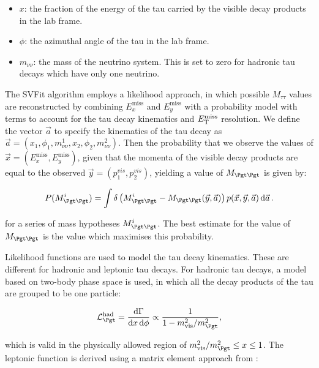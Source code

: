 \begin{itemize}
\item $x$: the fraction of the energy of the tau carried by the visible decay
products in the lab frame.
\item $\phi$: the azimuthal angle of the tau in the lab frame. 
\item $m_{\nu\nu}$: the mass of the neutrino system. This is set to zero for hadronic tau
decays which have only one neutrino.
\end{itemize}

The SVFit algorithm employs a likelihood approach, in which possible
$M_{\tau\tau}$ values are reconstructed by combining $E_{x}^{\text{miss}}$ and
$E_{y}^{\text{miss}}$ with a probability model with terms to account for the tau
decay kinematics and $E_{\mathrm{T}}^{\text{miss}}$ resolution. We define the vector $\vec{a}$ to
specify the kinematics of the tau decay as $\vec{a} =
\left(x_{1},\phi_{1},m_{\nu\nu}^{1},x_{2},\phi_{2},m_{\nu\nu}^{2}\right)$. Then the
probability that we observe the values of $\vec{x} = \left(E_{x}^{\text{miss}},
E_{y}^{\text{miss}}\right)$, given that the momenta of the visible decay products are
equal to the observed $\vec{y} = \left(p_{1}^{vis},p_{2}^{vis} \right)$,
yielding a value of $M_{\Pgt\Pgt}$ is given by: 

\begin{equation} \label{eqn:svfit-prob}
P(M_{\Pgt\Pgt}^{i}) = \int\delta\left(M_{\Pgt\Pgt}^{i} -
M_{\Pgt\Pgt}(\vec{y},\vec{a})\right)p(\vec{x},\vec{y},\vec{a})\,\text{d}\vec{a}\,
.
\end{equation}

for a series of mass hypotheses $M_{\Pgt\Pgt}^{i}$. The best estimate for the
value of $M_{\Pgt\Pgt}$ is the value which maximises this probability. 

Likelihood functions are used to model the tau decay kinematics. These are
different for hadronic and leptonic tau decays. For hadronic tau decays, a model
based on two-body phase space is used\cite{PDG}, in which all the decay products of the
tau are grouped to be one particle:

\begin{equation}
\mathcal{L}_{\Pgt}^{\text{had}} = \frac{\text{d}\Gamma}{\text{d}x\,\text{d}\phi}
\propto \frac{1}{1 - m_{\text{vis}}^{2} / m_{\Pgt}^{2}},
\end{equation}

which is valid in the physically allowed region of $m_{\text{vis}}^{2} /
m_{\Pgt}^{2} \leq x \leq 1$. The leptonic function is derived using a matrix
element approach from \cite{TauPol}:

